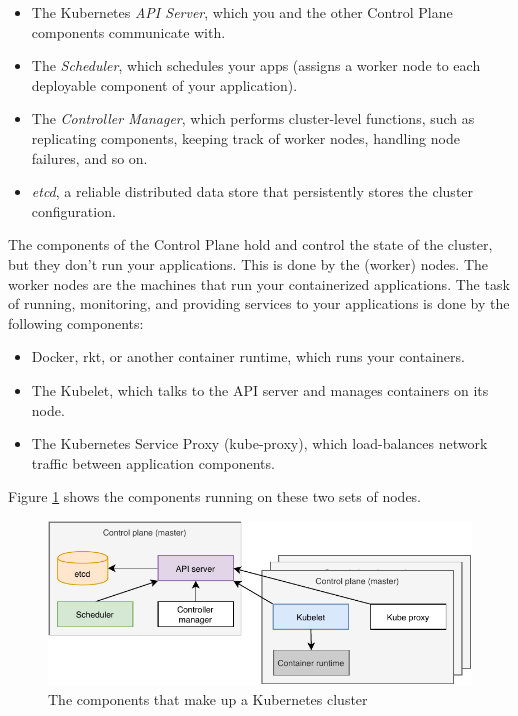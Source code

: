 \begin{itemize}
	\item The Kubernetes \textit{API Server}, which you and the other Control Plane components communicate with.
	\item The \textit{Scheduler}, which schedules your apps (assigns a worker node to each deployable component of your application).
	\item The \textit{Controller Manager}, which performs cluster-level functions, such as replicating components, keeping track of worker nodes, handling node failures, and so on.
	\item \textit{etcd}, a reliable distributed data store that persistently stores the cluster configuration. 
\end{itemize}
The components of the Control Plane hold and control the state of the cluster, but they don’t run your applications. This is done by the (worker) nodes.
The worker nodes are the machines that run your containerized applications. The task of running, monitoring, and providing services to your applications is done by the following components:
\begin{itemize}
	\item Docker, rkt, or another container runtime, which runs your containers.
	\item The Kubelet, which talks to the API server and manages containers on its node.
	\item The Kubernetes Service Proxy (kube-proxy), which load-balances network traffic
	between application components.
\end{itemize}
Figure \ref{fig:kubecluster} shows the components running on these two sets of nodes.


\begin{figure}[htbp]
	\centering
	\includegraphics[width=\textwidth]{images/kubecluster.pdf}
	\caption{The components that make up a Kubernetes cluster}
	\label{fig:kubecluster}
\end{figure}



